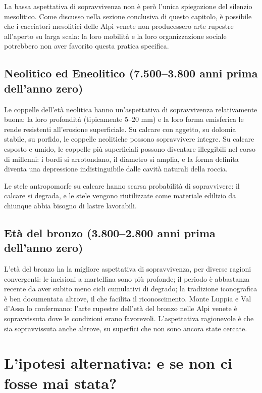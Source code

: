 La bassa aspettativa di sopravvivenza non è però l'unica spiegazione del silenzio mesolitico. Come discusso nella sezione conclusiva di questo capitolo, è possibile che i cacciatori mesolitici delle Alpi venete non producessero arte rupestre all'aperto su larga scala: la loro mobilità e la loro organizzazione sociale potrebbero non aver favorito questa pratica specifica.

\subsection{Neolitico ed Eneolitico (7.500--3.800 anni prima dell'anno zero)}

Le coppelle dell'età neolitica hanno un'aspettativa di sopravvivenza relativamente buona: la loro profondità (tipicamente 5--20 mm) e la loro forma emisferica le rende resistenti all'erosione superficiale. Su calcare con aggetto, su dolomia stabile, su porfido, le coppelle neolitiche possono sopravvivere integre. Su calcare esposto e umido, le coppelle più superficiali possono diventare illeggibili nel corso di millenni: i bordi si arrotondano, il diametro si amplia, e la forma definita diventa una depressione indistinguibile dalle cavità naturali della roccia.

Le stele antropomorfe su calcare hanno scarsa probabilità di sopravvivere: il calcare si degrada, e le stele vengono riutilizzate come materiale edilizio da chiunque abbia bisogno di lastre lavorabili.

\subsection{Età del bronzo (3.800--2.800 anni prima dell'anno zero)}

L'età del bronzo ha la migliore aspettativa di sopravvivenza, per diverse ragioni convergenti: le incisioni a martellina sono più profonde; il periodo è abbastanza recente da aver subito meno cicli cumulativi di degrado; la tradizione iconografica è ben documentata altrove, il che facilita il riconoscimento. Monte Luppia e Val d'Assa lo confermano: l'arte rupestre dell'età del bronzo nelle Alpi venete è sopravvissuta dove le condizioni erano favorevoli. L'aspettativa ragionevole è che sia sopravvissuta anche altrove, su superfici che non sono ancora state cercate.

\section{L'ipotesi alternativa: e se non ci fosse mai stata?}

